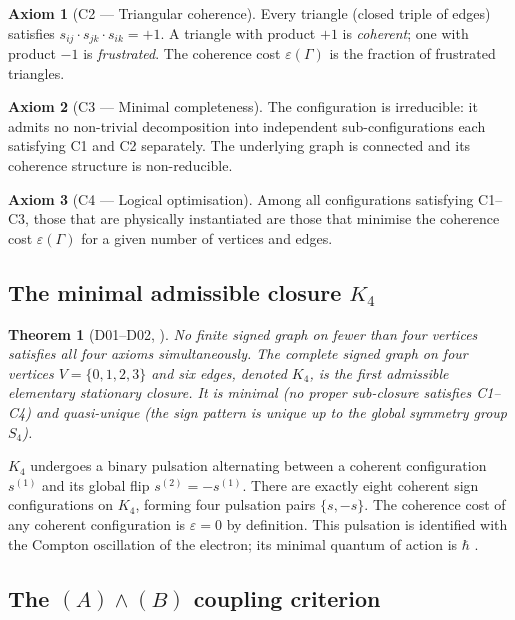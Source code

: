 \documentclass[12pt,a4paper]{article}
\theoremstyle{plain}
\newtheorem{theorem}{Theorem}[section]
\theoremstyle{definition}
\newtheorem{axiom}{Axiom}
\theoremstyle{remark}
\newcommand{\Kfour}{K_4}
\newcommand{\eps}{\varepsilon}
\begin{document}
\begin{axiom}[C2 --- Triangular coherence]
Every triangle (closed triple of edges) satisfies $s_{ij} \cdot s_{jk} \cdot s_{ik} = +1$.
A triangle with product $+1$ is \emph{coherent}; one with product $-1$ is
\emph{frustrated}. The coherence cost $\eps(\Gamma)$ is the fraction of frustrated
triangles.
\end{axiom}

\begin{axiom}[C3 --- Minimal completeness]
The configuration is irreducible: it admits no non-trivial decomposition into
independent sub-configurations each satisfying C1 and C2 separately. The underlying
graph is connected and its coherence structure is non-reducible.
\end{axiom}

\begin{axiom}[C4 --- Logical optimisation]
Among all configurations satisfying C1--C3, those that are physically instantiated
are those that minimise the coherence cost $\eps(\Gamma)$ for a given number of
vertices and edges.
\end{axiom}

\subsection{The minimal admissible closure \texorpdfstring{$K_4$}{K4}}

\begin{theorem}[D01--D02, \cite{D01,D02}]
No finite signed graph on fewer than four vertices satisfies all four axioms
simultaneously. The complete signed graph on four vertices $V = \{0,1,2,3\}$ and six
edges, denoted $\Kfour$, is the first admissible elementary stationary closure. It is
minimal (no proper sub-closure satisfies C1--C4) and quasi-unique (the sign pattern
is unique up to the global symmetry group $S_4$).
\end{theorem}

$\Kfour$ undergoes a binary pulsation alternating between a coherent configuration
$s^{(1)}$ and its global flip $s^{(2)} = -s^{(1)}$. There are exactly eight coherent
sign configurations on $\Kfour$, forming four pulsation pairs $\{s, -s\}$. The
coherence cost of any coherent configuration is $\eps = 0$ by definition. This
pulsation is identified with the Compton oscillation of the electron; its minimal
quantum of action is $\hbar$ \cite{D01}.

\subsection{The \texorpdfstring{$(A)\wedge(B)$}{(A)∧(B)} coupling criterion}
\end{document}
